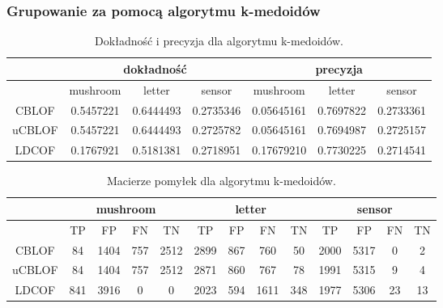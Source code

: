 \documentclass[11pt,a4paper,twoside]{article}
\begin{document}
\subsubsection{Grupowanie za pomocą algorytmu k-medoidów }


\begin{table}[ht]
\centering
\caption{Dokładność i precyzja dla algorytmu k-medoidów.}
\label{accPrec_v2}
\begin{tabular}{|*{7}{c|}}
\hline
 & \multicolumn{3}{c|}{dokładność} & \multicolumn{3}{c|}{precyzja} \\\hline
 & mushroom & letter & sensor & mushroom & letter & sensor \\\hline
 CBLOF &      0.5457221  &     0.6444493     &    0.2735346  &    0.05645161 &   0.7697822   &    0.2733361  \\\hline
 uCBLOF &    0.5457221   &     0.6444493    &   0.2725782   &  0.05645161   &   0.7694987  &    0.2725157  \\\hline
 LDCOF &     0.1767921   &      0.5181381   &    0.2718951   &   0.17679210  &   0.7730225 &     0.2714541 \\\hline
\end{tabular}
\end{table}



\begin{table}[H]
\centering
\caption{Macierze pomyłek dla algorytmu k-medoidów.}
\label{confMatrix_v1}
\begin{tabular}{|*{13}{c|}}
\hline
 & \multicolumn{4}{c|}{mushroom} & \multicolumn{4}{c|}{letter} & \multicolumn{4}{c|}{sensor} \\\hline
 & TP & FP & FN & TN  & TP & FP & FN & TN  & TP & FP & FN & TN \\\hline
 CBLOF    &    84     &   1404     &   757    &   2512    &     2899   &   867  &  760   & 50  & 2000  &   5317   &   0   &   2        \\\hline
 uCBLOF &    84      &    1404    &   757    &    2512   &      2871  &   860 &   767   &78  &  1991 &    5315 &    9   &   4     \\\hline
 LDCOF   &   841     &   3916    &    0       &     0        &      2023  &    594 &  1611   & 348  &   1977  &   5306   &   23  &   13  \\\hline
\end{tabular}
\end{table}
\end{document}
